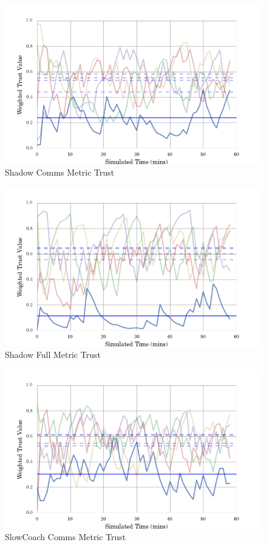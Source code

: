 \documentclass{aamas2016}
\begin{document}
\begin{figure}[h]
	\centering
	\includegraphics[width=\linewidth]{best_comms_run_Shadow}
	\caption{Shadow Comms Metric Trust}
	\label{fig:comms_shadow}
\end{figure}

\begin{figure}[h]
	\centering
	\includegraphics[width=\linewidth]{best_full_run_Shadow}
	\caption{Shadow Full Metric Trust}
	\label{fig:full_shadow}
\end{figure}


\begin{figure}[h]
	\centering
  \includegraphics[width=\linewidth]{best_comms_run_SlowCoach}
	\caption{SlowCoach Comms Metric Trust}
	\label{fig:comms_slowcoach}
\end{figure}
\end{document}

